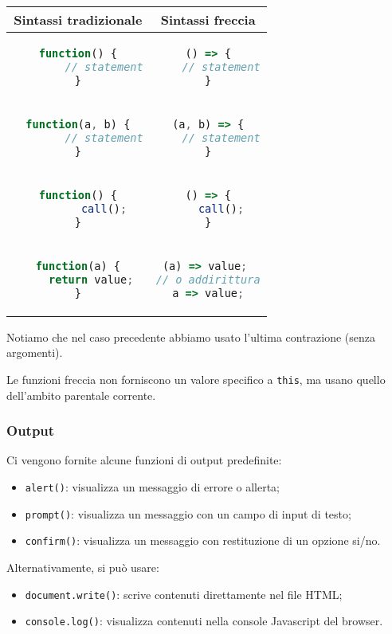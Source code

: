 \documentclass[a4paper,11pt]{article}
\begin{document}
\begin{table}[h!]
	\center {}
	\begin{tabular} { c | c }
		\bfseries Sintassi tradizionale & \bfseries Sintassi freccia \\
		\hline 

\begin{lstlisting}[language=javascript, style=codestyle]	
function() {
		// statement
}
\end{lstlisting} &
\begin{lstlisting}[language=javascript, style=codestyle]	
() => {
	// statement
}
\end{lstlisting} \\

\begin{lstlisting}[language=javascript, style=codestyle]	
function(a, b) {
		// statement
}
\end{lstlisting} &
\begin{lstlisting}[language=javascript, style=codestyle]	
(a, b) => {
	// statement
}
\end{lstlisting} \\

\begin{lstlisting}[language=javascript, style=codestyle]	
function() {
		call();
}
\end{lstlisting} &
\begin{lstlisting}[language=javascript, style=codestyle]	
() => {
	call();
}
\end{lstlisting} \\

\begin{lstlisting}[language=javascript, style=codestyle]	
function(a) {
	return value;
}
\end{lstlisting} &
\begin{lstlisting}[language=javascript, style=codestyle]	
(a) => value; 
// o addirittura
a => value;
\end{lstlisting} \\
	\end{tabular}
\end{table}

Notiamo che nel caso precedente abbiamo usato l'ultima contrazione (senza argomenti). 

Le funzioni freccia non forniscono un valore specifico a \lstinline|this|, ma usano quello dell'ambito parentale corrente.

\subsubsection{Output}
Ci vengono fornite alcune funzioni di output predefinite:
\begin{itemize}
	\item \lstinline|alert()|: visualizza un messaggio di errore o allerta;
	\item \lstinline|prompt()|: visualizza un messaggio con un campo di input di testo;
	\item \lstinline|confirm()|: visualizza un messaggio con restituzione di un opzione si/no.
\end{itemize}

Alternativamente, si può usare:
\begin{itemize}
	\item \lstinline|document.write()|: scrive contenuti direttamente nel file HTML;
	\item \lstinline|console.log()|: visualizza contenuti nella console Javascript del browser.
\end{itemize}
\end{document}
